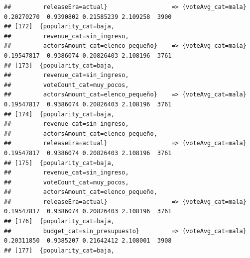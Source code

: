 \documentclass[
]{article}
\begin{document}
\begin{verbatim}
##         releaseEra=actual}                  => {voteAvg_cat=mala}                0.20270270  0.9390802 0.21585239 2.109258  3900
## [172]  {popularity_cat=baja,                                                                                                    
##         revenue_cat=sin_ingreso,                                                                                                
##         actorsAmount_cat=elenco_pequeño}    => {voteAvg_cat=mala}                0.19547817  0.9386074 0.20826403 2.108196  3761
## [173]  {popularity_cat=baja,                                                                                                    
##         revenue_cat=sin_ingreso,                                                                                                
##         voteCount_cat=muy_pocos,                                                                                                
##         actorsAmount_cat=elenco_pequeño}    => {voteAvg_cat=mala}                0.19547817  0.9386074 0.20826403 2.108196  3761
## [174]  {popularity_cat=baja,                                                                                                    
##         revenue_cat=sin_ingreso,                                                                                                
##         actorsAmount_cat=elenco_pequeño,                                                                                        
##         releaseEra=actual}                  => {voteAvg_cat=mala}                0.19547817  0.9386074 0.20826403 2.108196  3761
## [175]  {popularity_cat=baja,                                                                                                    
##         revenue_cat=sin_ingreso,                                                                                                
##         voteCount_cat=muy_pocos,                                                                                                
##         actorsAmount_cat=elenco_pequeño,                                                                                        
##         releaseEra=actual}                  => {voteAvg_cat=mala}                0.19547817  0.9386074 0.20826403 2.108196  3761
## [176]  {popularity_cat=baja,                                                                                                    
##         budget_cat=sin_presupuesto}         => {voteAvg_cat=mala}                0.20311850  0.9385207 0.21642412 2.108001  3908
## [177]  {popularity_cat=baja,                                                                                                    

\end{verbatim}
\end{document}
